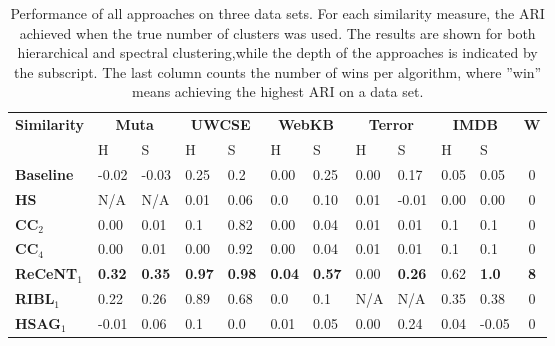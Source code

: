 \begin{table*}[t]
\begin{center}
\footnotesize
\caption{Performance of all approaches on three data sets. For each similarity measure, the ARI achieved when the true number of clusters was used. The results are shown for both hierarchical and spectral clustering,while the depth of the approaches is indicated by the subscript. The last column counts the number of wins per algorithm, where ''win'' means achieving the highest ARI on a data set.\label{tab:Results}}

\begin{tabular}[t]{|p{1.3cm}|p{0.6cm}|p{0.6cm}|p{0.6cm}|p{0.5cm}|p{0.5cm}|p{0.5cm}|p{0.5cm}|p{0.6cm}|p{0.6cm}|p{0.6cm}|c|}
	\hline
	\multirow{2}{*}{\textbf{Similarity}} & \multicolumn{2}{|c|}{\textbf{Muta}} & \multicolumn{2}{|c|}{\textbf{UWCSE}} & \multicolumn{2}{|c|}{\textbf{WebKB}} & \multicolumn{2}{|c|}{\textbf{Terror}}  & \multicolumn{2}{|c|}{\textbf{IMDB}} & \multirow{2}{*}{\textbf{W}}\\
	                     &  H       & S              & H      & S                 & H      & S         & H    & S           & H   & S &  \\
	\hline
	\textbf{Baseline}     &  -0.02 & -0.03		     &   0.25 	&  0.2         	  &  0.00  &  0.25     & 0.00 & 0.17 		& 0.05 & 0.05 & 0  \\
	\hline
	\textbf{HS}          &  N/A	 & N/A		     	 &   0.01 	&  0.06           &  0.0 &  0.10      	& 0.01 & -0.01		& 0.00 & 0.00 & 0 \\
	\hline
	\textbf{CC$_2$}      &  0.00 &  0.01	     	 &  0.1	 &  0.82       	  	   & 0.00 & 0.04       & 0.01 & 0.01 		& 0.1 & 0.1  & 0\\
	\hline
	\textbf{CC$_4$}      &  0.00 &  0.01	     	 &  0.00 & 0.92 	   & 0.00 & 0.04       			& 0.01 & 0.01  		& 0.1 & 0.1 & 0 \\
	\hline
	\hline
	\textbf{ReCeNT$_1$}    &  \textbf{0.32} & \textbf{0.35}     &\textbf{0.97} 	&  \textbf{0.98}   &  \textbf{0.04  } &  \textbf{0.57} & 0.00 & \textbf{0.26} & 0.62 & \textbf{1.0}  & \textbf{8}\\
	\hline
	\textbf{RIBL$_1$}    &  0.22 & 0.26 		     &   0.89       	& 0.68      &  0.0           	 &  0.1   & N/A & N/A  & 0.35 &  0.38 & 0   \\
	\hline
	\textbf{HSAG$_1$}    &  -0.01 & 0.06           &   0.1        	&  0.0               &  0.01       	 &  0.05    & 0.00 & 0.24 & 0.04 &  -0.05 & 0    \\

\end{tabular}
\end{center}
\end{table*}
